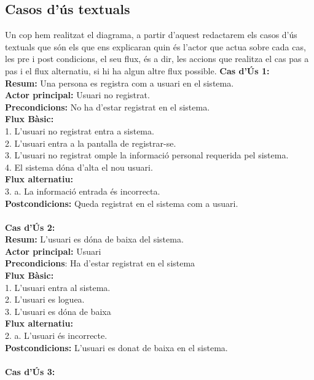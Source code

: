 \documentclass{article}
\begin{document}
\subsection{Casos d'\'us textuals}
Un cop hem realitzat el diagrama, a partir d'aquest redactarem els casos d'\'us textuals que s\'on els que ens explicaran quin \'es l'actor que actua sobre cada cas, les pre i post condicions, el seu flux, \'es a dir, les accions que realitza el cas pas a pas i el flux alternatiu, si hi ha algun altre flux possible.
\newline
\textbf{Cas d'\'Us 1:}\\
\textbf{Resum:} Una persona es registra com a usuari en el sistema.\\
\textbf{Actor principal:} Usuari no registrat.\\
\textbf{Precondicions:} No ha d'estar registrat en el sistema.\\
\textbf{Flux B\`asic:}\\
1. L'usuari no registrat entra a sistema.\\
2. L'usuari entra a la pantalla de registrar-se.\\
3. L'usuari no registrat omple la informaci\'o personal requerida pel sistema.\\
4. El sistema d\'ona d'alta el nou usuari.\\
\textbf{ Flux alternatiu:}\\
3. a. La informació entrada \'es incorrecta.\\
\textbf{Postcondicions:} Queda registrat en el sistema com a usuari.\\\\
\textbf{Cas d'\'Us 2:}\\
\textbf{Resum:} L'usuari es d\'ona de baixa del sistema.\\
\textbf{Actor principal:} Usuari\\
\textbf{Precondicions}: Ha d'estar registrat en el sistema\\
\textbf{Flux B\`asic:}\\
1. L'usuari entra al sistema.\\
2. L'usuari es loguea.\\
3. L'usuari es d\'ona de baixa\\
\textbf{Flux alternatiu:\\}
2. a. L'usuari \'es incorrecte.\\
\textbf{Postcondicions:} L'usuari es donat de baixa en el sistema.\\\\
\textbf{Cas d'\'Us 3:}\\
\end{document}
